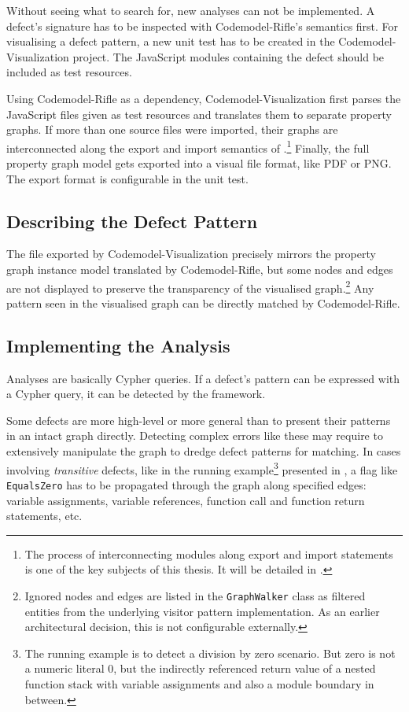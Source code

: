 Without seeing what to search for, new analyses can not be implemented. A defect's signature has to be inspected with Codemodel-Rifle's semantics first. For visualising a defect pattern, a new unit test has to be created in the Codemodel-Visualization project. The JavaScript modules containing the defect should be included as test resources.

Using Codemodel-Rifle as a dependency, Codemodel-Visualization first parses the JavaScript files given as test resources and translates them to separate property graphs. If more than one source files were imported, their graphs are interconnected along the export and import semantics of \es.\footnote{The process of interconnecting \es modules along export and import statements is one of the key subjects of this thesis. It will be detailed in .} Finally, the full property graph model gets exported into a visual file format, like PDF or PNG. The export format is configurable in the unit test.


\subsection{Describing the Defect Pattern}

The file exported by Codemodel-Visualization precisely mirrors the property graph instance model translated by Codemodel-Rifle, but some nodes and edges are not displayed to preserve the transparency of the visualised graph.\footnote{Ignored nodes and edges are listed in the \lstinline{GraphWalker} class as filtered entities from the underlying visitor pattern implementation. As an earlier architectural decision, this is not configurable externally.} Any pattern seen in the visualised graph can be directly matched by Codemodel-Rifle.


\subsection{Implementing the Analysis}
\label{subsection:implementing-analyses}

Analyses are basically Cypher queries. If a defect's pattern can be expressed with a Cypher query, it can be detected by the framework.

Some defects are more high-level or more general than to present their patterns in an intact graph directly. Detecting complex errors like these may require to extensively manipulate the graph to dredge defect patterns for matching. In cases involving \emph{transitive} defects, like in the running example\footnote{The running example is to detect a division by zero scenario. But zero is not a numeric literal $0$, but the indirectly referenced return value of a nested function stack with variable assignments and also a module boundary in between.} presented in , a flag like \lstinline{EqualsZero} has to be propagated through the graph along specified edges: variable assignments, variable references, function call and function return statements, etc.

